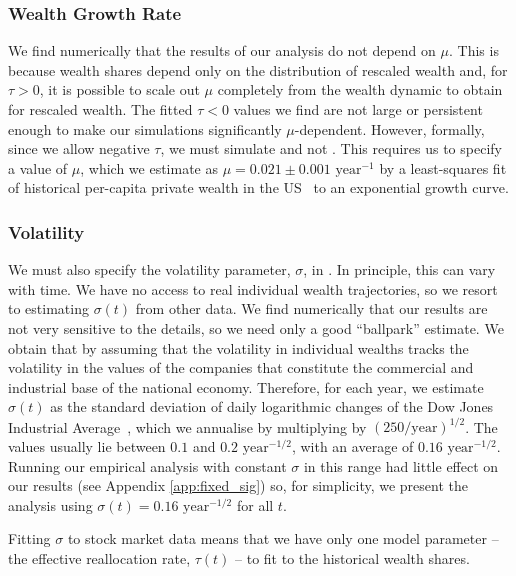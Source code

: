 \subsubsection{Wealth Growth Rate}
We find numerically that the results of our analysis do not depend on $\mu$. This is because wealth shares depend only on the distribution of rescaled wealth and, for $\tau>0$, it is possible to scale out $\mu$ completely from the wealth dynamic to obtain  for rescaled wealth. The fitted $\tau<0$ values we find are not large or persistent enough to make our simulations significantly $\mu$-dependent. However, formally, since we allow negative $\tau$, we must simulate  and not . This requires us to specify a value of $\mu$, which we estimate as $\mu=0.021\pm 0.001 \text{ year}^{-1}$ by a least-squares fit of historical per-capita private wealth in the US~\cite{PikettyZucman2014} to an exponential growth curve.

\subsubsection{Volatility}
We must also specify the volatility parameter, $\sigma$, in . In principle, this can vary with time. We have no access to real individual wealth trajectories, so we resort to estimating $\sigma\left(t\right)$ from other data. We find numerically that our results are not very sensitive to the details, so we need only a good ``ballpark'' estimate. We obtain that by assuming that the volatility in individual wealths tracks the volatility in the values of the companies that constitute the commercial and industrial base of the national economy. Therefore, for each year, we estimate $\sigma\left(t\right)$ as the standard deviation of daily logarithmic changes of the Dow Jones Industrial Average~\cite{Quandl2016}, which we annualise by multiplying by $\left(250/\text{year}\right)^{1/2}$. The values usually lie between $0.1$ and $0.2 \text{ year}^{-1/2}$, with an average of $0.16\text{ year}^{-1/2}$. Running our empirical analysis with constant $\sigma$ in this range had little effect on our results (see Appendix \ref{app:fixed_sig}) so, for simplicity, we present the analysis using $\sigma\left(t\right)=0.16\text{ year}^{-1/2}$ for all $t$.

Fitting $\sigma$ to stock market data means that we have only one model parameter -- the effective reallocation rate, $\tau\left(t\right)$ -- to fit to the historical wealth shares.


